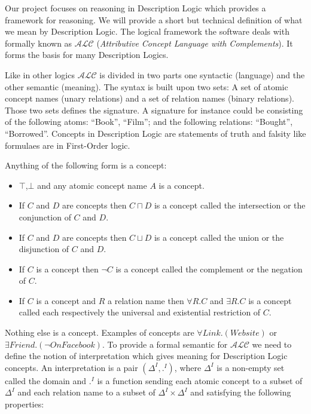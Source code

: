 Our project focuses on reasoning in Description Logic which provides a
framework for reasoning. We will provide a short but technical
definition of what we mean by Description Logic. The logical framework
the software deals with formally known as $\mathcal{ALC}$
(\textit{Attributive Concept Language with Complements}). It forms the
basis for many Description Logics.

Like in other logics $\mathcal{ALC}$ is divided in two parts one
syntactic (language) and the other semantic (meaning). The
syntax is built upon two sets: A set of atomic concept names (unary
relations) and a set of relation names (binary relations). Those two
sets defines the signature. A signature for instance could be
consisting of the following atoms: ``Book'', ``Film''; and the
following relations: ``Bought'', ``Borrowed''. Concepts in Description
Logic are statements of truth and falsity like formulaes are in
First-Order logic. 

Anything of the following form is a concept:
\begin{itemize}
\item $\top$,$\bot$ and any atomic concept name $A$ is a concept.
\item If $C$ and $D$ are concepts then $C \sqcap D$ is a concept
  called the intersection or the conjunction of $C$ and $D$.
\item If $C$ and $D$ are concepts then $C \sqcup D$ is a concept
  called the union or the disjunction of $C$ and $D$.
\item If $C$ is a concept then $\neg C$ is a concept called the complement or the
  negation of $C$.
\item If $C$ is a concept and $R$ a relation name then $\forall R . C$
  and $\exists R . C$ is a concept called each respectively the
  universal and existential restriction of $C$.
\end{itemize}

Nothing else is a concept. Examples of concepts are $\forall Link
. (Website)$ or $\exists Friend . (\neg OnFacebook)$. To provide a
formal semantic for $\mathcal{ALC}$ we need to define the notion of
interpretation which gives meaning for Description Logic concepts. An
interpretation is a pair $(\Delta^{I},.^{I})$, where $\Delta^{I}$ is a
non-empty set called the domain and $.^{I}$ is a function sending each
atomic concept to a subset of $\Delta^{I}$ and each relation name to a
subset of $\Delta^{I} \times \Delta^{I}$ and satisfying the following 
properties:

